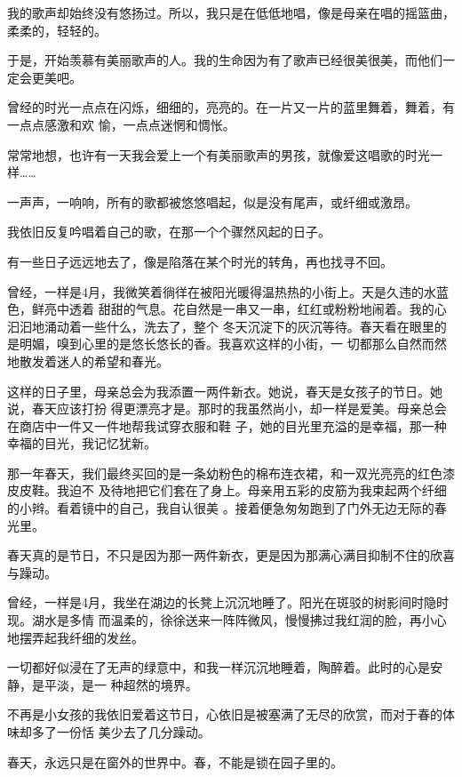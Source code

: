 \documentclass[12pt,a4paper]{article}
\def\blankrev{\vspace{1ex}}									%
\begin{document}
		我的歌声却始终没有悠扬过。所以，我只是在低低地唱，像是母亲在唱的摇篮曲，柔柔的，轻轻的。

		于是，开始羡慕有美丽歌声的人。我的生命因为有了歌声已经很美很美，而他们一定会更美吧。

		曾经的时光一点点在闪烁，细细的，亮亮的。在一片又一片的蓝里舞着，舞着，有一点点感激和欢
	愉，一点点迷惘和惆怅。

		常常地想，也许有一天我会爱上一个有美丽歌声的男孩，就像爱这唱歌的时光一样……

		一声声，一响响，所有的歌都被悠悠唱起，似是没有尾声，或纤细或激昂。

		我依旧反复吟唱着自己的歌，在那一个个骤然风起的日子。

	\endwriting



		有一些日子远远地去了，像是陷落在某个时光的转角，再也找寻不回。

		\blankrev
		曾经，一样是4月，我微笑着徜徉在被阳光暖得温热热的小街上。天是久违的水蓝色，鲜亮中透着
	甜甜的气息。花自然是一串又一串，红红或粉粉地闹着。我的心汩汩地涌动着一些什么，洗去了，整个
	冬天沉淀下的灰沉等待。春天看在眼里的是明媚，嗅到心里的是悠长悠长的香。我喜欢这样的小街，一
	切都那么自然而然地散发着迷人的希望和春光。

		这样的日子里，母亲总会为我添置一两件新衣。她说，春天是女孩子的节日。她说，春天应该打扮
	得更漂亮才是。那时的我虽然尚小，却一样是爱美。母亲总会在商店中一件又一件地帮我试穿衣服和鞋
	子，她的目光里充溢的是幸福，那一种幸福的目光，我记忆犹新。

		那一年春天，我们最终买回的是一条幼粉色的棉布连衣裙，和一双光亮亮的红色漆皮皮鞋。我迫不
	及待地把它们套在了身上。母亲用五彩的皮筋为我束起两个纤细的小辫。看着镜中的自己，我自认很美
	。接着便急匆匆跑到了门外无边无际的春光里。

		春天真的是节日，不只是因为那一两件新衣，更是因为那满心满目抑制不住的欣喜与躁动。

		曾经，一样是4月，我坐在湖边的长凳上沉沉地睡了。阳光在斑驳的树影间时隐时现。湖水是多情
	而温柔的，徐徐送来一阵阵微风，慢慢拂过我红润的脸，再小心地摆弄起我纤细的发丝。

		一切都好似浸在了无声的绿意中，和我一样沉沉地睡着，陶醉着。此时的心是安静，是平淡，是一
	种超然的境界。

		不再是小女孩的我依旧爱着这节日，心依旧是被塞满了无尽的欣赏，而对于春的体味却多了一份恬
	美少去了几分躁动。

		春天，永远只是在窗外的世界中。春，不能是锁在园子里的。
\end{document}
